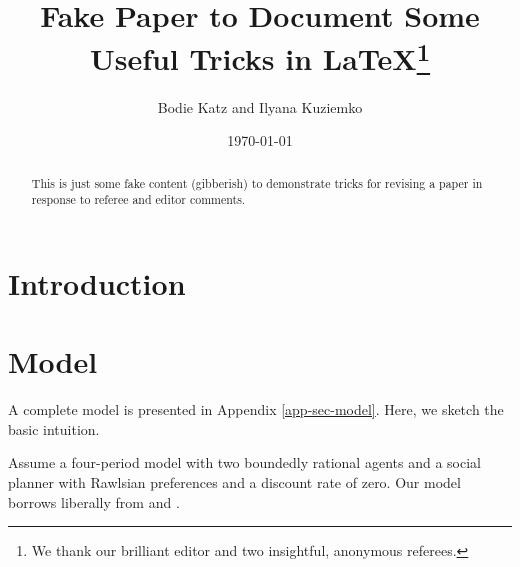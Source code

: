 \documentclass[12pt,pdftex, notitlepage]{article}
\begin{document}
\begin{refsection}

\author{Bodie Katz and Ilyana Kuziemko}
\title{\vspace{-2.5cm}\Large{Fake Paper to Document Some Useful Tricks in \LaTeX }\thanks{We thank our brilliant editor and two insightful, anonymous referees.}}
\date{\today}

\maketitle
\begin{abstract}
\noindent
This is just some fake content (gibberish) to demonstrate tricks for revising a paper in response to referee and editor comments.  
\end{abstract}


\thispagestyle{empty}

\newpage

\onehalfspacing
\setcounter{page}{1}

\section{Introduction}\label{sec-intro}

\label{intro-page} 

\section{Model}\label{sec-model}

A complete model is presented in Appendix \ref{app-sec-model}.  Here, we sketch the basic intuition.

Assume a four-period model with two boundedly rational agents and a social planner with Rawlsian preferences and a discount rate of zero.  Our model borrows liberally from \citet{mirrlees1971} and \citet{harry_potter}.


\end{refsection}
\end{document}
